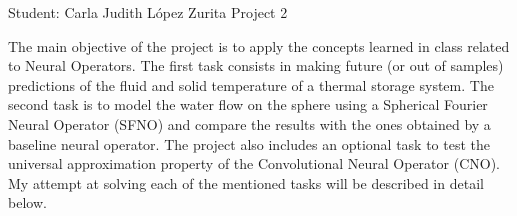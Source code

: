 \documentclass[unicode,11pt,a4paper,oneside,numbers=endperiod,openany]{scrartcl}
\begin{document}
\setassignment
{}

            {Student: Carla Judith L\'opez Zurita}
            {}{Project 2}

The main objective of the project is to apply the concepts learned in class
related to Neural Operators. 
The first task consists in making future (or out of samples) predictions of the fluid and solid
temperature of a thermal storage system. The second task is to model the water
flow on the sphere using a
Spherical Fourier Neural Operator (SFNO) and compare the results with the ones
obtained by a baseline neural operator.
The project also includes an optional task to test the universal approximation
property of the Convolutional Neural Operator (CNO).
My attempt at solving each of the mentioned tasks will be described in detail below.
\end{document}
